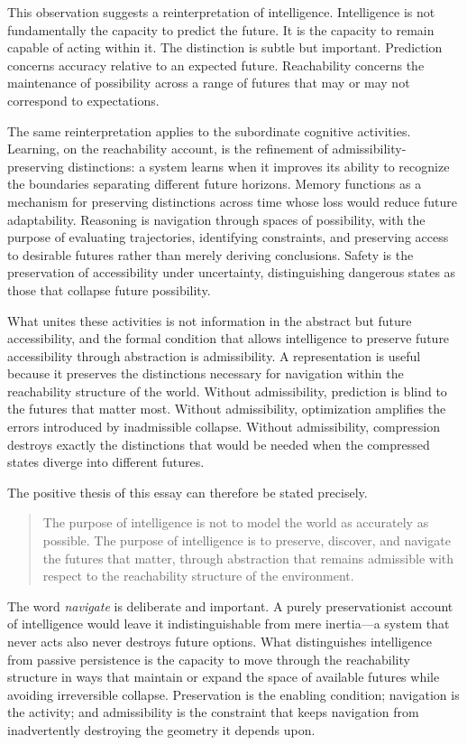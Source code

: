 \documentclass[12pt,a4paper]{article}
\theoremstyle{plain}
\theoremstyle{definition}
\theoremstyle{remark}
\begin{document}
This observation suggests a reinterpretation of intelligence. Intelligence
is not fundamentally the capacity to predict the future. It is the capacity
to remain capable of acting within it. The distinction is subtle but
important. Prediction concerns accuracy relative to an expected future.
Reachability concerns the maintenance of possibility across a range of
futures that may or may not correspond to expectations.

The same reinterpretation applies to the subordinate cognitive activities.
Learning, on the reachability account, is the refinement of
admissibility-preserving distinctions: a system learns when it improves its
ability to recognize the boundaries separating different future horizons.
Memory functions as a mechanism for preserving distinctions across time whose
loss would reduce future adaptability. Reasoning is navigation through spaces
of possibility, with the purpose of evaluating trajectories, identifying
constraints, and preserving access to desirable futures rather than merely
deriving conclusions. Safety is the preservation of accessibility under
uncertainty, distinguishing dangerous states as those that collapse future
possibility.

What unites these activities is not information in the abstract but future
accessibility, and the formal condition that allows intelligence to preserve
future accessibility through abstraction is admissibility. A representation
is useful because it preserves the distinctions necessary for navigation
within the reachability structure of the world. Without admissibility,
prediction is blind to the futures that matter most. Without admissibility,
optimization amplifies the errors introduced by inadmissible collapse.
Without admissibility, compression destroys exactly the distinctions that
would be needed when the compressed states diverge into different futures.

The positive thesis of this essay can therefore be stated precisely.

\begin{quote}
  The purpose of intelligence is not to model the world as accurately as
  possible. The purpose of intelligence is to preserve, discover, and
  navigate the futures that matter, through abstraction that remains
  admissible with respect to the reachability structure of the environment.
\end{quote}

The word \emph{navigate} is deliberate and important. A purely preservationist
account of intelligence would leave it indistinguishable from mere
inertia---a system that never acts also never destroys future options. What
distinguishes intelligence from passive persistence is the capacity to move
through the reachability structure in ways that maintain or expand the space
of available futures while avoiding irreversible collapse. Preservation is
the enabling condition; navigation is the activity; and admissibility is the
constraint that keeps navigation from inadvertently destroying the geometry
it depends upon.
\end{document}
